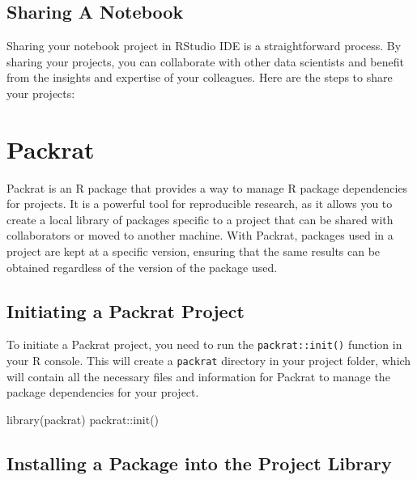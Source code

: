 \documentclass[
]{book}
\newenvironment{Shaded}{\begin{snugshade}}{\end{snugshade}}
\newcommand{\FunctionTok}[1]{\textcolor[rgb]{0.00,0.00,0.00}{#1}}
\newcommand{\NormalTok}[1]{#1}
\newcommand{\SpecialCharTok}[1]{\textcolor[rgb]{0.00,0.00,0.00}{#1}}
\begin{document}
\hypertarget{sharing-a-notebook}{%
\subsection*{Sharing A Notebook}\label{sharing-a-notebook}}

Sharing your notebook project in RStudio IDE is a straightforward process. By sharing your projects, you can collaborate with other data scientists and benefit from the insights and expertise of your colleagues. Here are the steps to share your projects:

\hypertarget{packrat}{%
\section{Packrat}\label{packrat}}

Packrat is an R package that provides a way to manage R package dependencies for projects. It is a powerful tool for reproducible research, as it allows you to create a local library of packages specific to a project that can be shared with collaborators or moved to another machine. With Packrat, packages used in a project are kept at a specific version, ensuring that the same results can be obtained regardless of the version of the package used.

\hypertarget{initiating-a-packrat-project}{%
\subsection*{Initiating a Packrat Project}\label{initiating-a-packrat-project}}

To initiate a Packrat project, you need to run the \texttt{packrat::init()} function in your R console. This will create a \texttt{packrat} directory in your project folder, which will contain all the necessary files and information for Packrat to manage the package dependencies for your project.

\begin{Shaded}
\begin{Highlighting}[]
\FunctionTok{library}\NormalTok{(packrat)}
\NormalTok{packrat}\SpecialCharTok{::}\FunctionTok{init}\NormalTok{()}
\end{Highlighting}
\end{Shaded}

\hypertarget{installing-a-package-into-the-project-library}{%
\subsection*{Installing a Package into the Project Library}\label{installing-a-package-into-the-project-library}}
\end{document}
